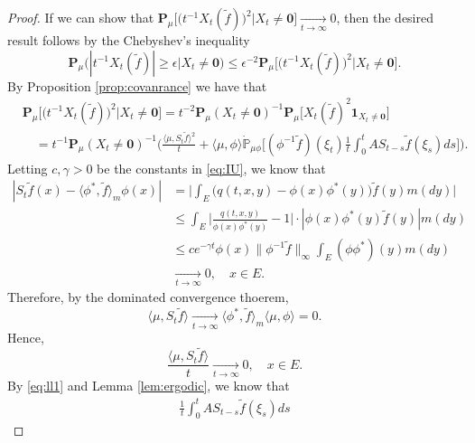 \begin{proof}
	If we can show that $\mathbf P_\mu\big[\big(t^{-1}X_t(\tilde f)\big)^2|X_t \neq \mathbf 0\big]\xrightarrow[t\to\infty]{} 0$, then the desired result follows by the Chebyshev's inequality
\[
	\mathbf P_\mu \big( | t^{-1} X_t(\tilde f) | \geq \epsilon \big | X_t \neq \mathbf 0\big)
	\leq \epsilon^{-2}\mathbf P_\mu \big[ \big(t^{-1} X_t(\tilde f)\big)^2 \big | X_t \neq \mathbf 0 \big].
\]
	By Proposition \ref{prop:covanrance} we have that
\begin{equation}\label{eq:general-lemma-1}\begin{split}
	&\mathbf P_\mu\big[\big(t^{-1}X_t(\tilde f)\big)^2\big|X_t \neq \mathbf 0\big]
	= t^{-2} \mathbf P_\mu (X_t\neq \mathbf 0)^{-1}\mathbf P_\mu\big[X_t(\tilde f)^2\mathbf 1_{X_t\neq \mathbf 0}\big] \\
	&\quad= t^{-1} \mathbf P_\mu (X_t\neq \mathbf 0)^{-1} \Big(\frac{\langle \mu,S_t\tilde f\rangle^2}{t} + \langle \mu,\phi \rangle\dot{\mathbb P}_{\mu\phi}\big[(\phi^{-1}\tilde f)(\xi_t)\frac{1}{t}\int_0^t A S_{t-s} \tilde f(\xi_s)ds\big]\Big).
\end{split}\end{equation}
	Letting $c,\gamma > 0$ be the constants in \eqref{eq:IU}, we know that
\begin{equation}\label{eq:ll1}\begin{split}
	| S_t\tilde f (x) - \langle \phi^* , \tilde f \rangle_m \phi(x)|
	&= \Big | \int_{E} \big(q(t,x,y) - \phi(x)\phi^*(y)\big) \tilde f (y) m(dy) \Big | \\
	&\leq \int_{E} \big|\frac{q(t,x,y)}{\phi(x)\phi^*(y)} - 1 \big| \cdot |\phi(x)\phi^*(y) \tilde f (y) | m(dy) \\
	& \leq ce^{-\gamma t} \phi(x) \|\phi^{-1}\tilde f\|_\infty \int_{E} (\phi\phi^*)(y) m(dy)\\
	& \xrightarrow[t\to\infty]{} 0,
	\quad x\in E.
\end{split}\end{equation}
Therefore, by the dominated convergence thoerem,
\[
	\langle \mu,S_t\tilde f\rangle
	\xrightarrow[t\to \infty]{} \langle \phi^*, \tilde f\rangle_m\langle \mu, \phi\rangle
	= 0.
\]
	Hence,	
\begin{equation}\label{eq:S_t}
	\frac{ \langle \mu,S_t\tilde f\rangle}{t}
	\xrightarrow [t\to\infty]{} 0,
	\quad x\in E.
\end{equation}
	By \eqref{eq:ll1} and Lemma \ref{lem:ergodic}, we know that
\[\begin{split}
	\frac{1}{t}\int_0^t A S_{t-s} \tilde f(\xi_s)ds

\end{split}\]
\end{proof}
